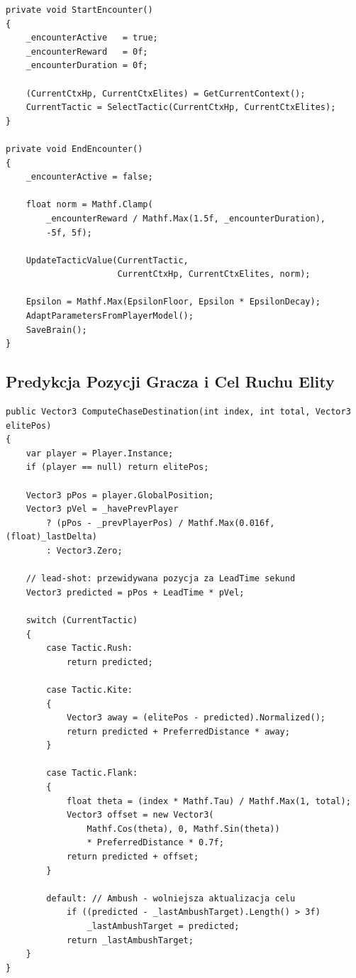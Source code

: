 \begin{lstlisting}[caption={EliteBrain.StartEncounter / EndEncounter},label={lst:eb-encounter}]
private void StartEncounter()
{
    _encounterActive   = true;
    _encounterReward   = 0f;
    _encounterDuration = 0f;

    (CurrentCtxHp, CurrentCtxElites) = GetCurrentContext();
    CurrentTactic = SelectTactic(CurrentCtxHp, CurrentCtxElites);
}

private void EndEncounter()
{
    _encounterActive = false;

    float norm = Mathf.Clamp(
        _encounterReward / Mathf.Max(1.5f, _encounterDuration),
        -5f, 5f);

    UpdateTacticValue(CurrentTactic,
                      CurrentCtxHp, CurrentCtxElites, norm);

    Epsilon = Mathf.Max(EpsilonFloor, Epsilon * EpsilonDecay);
    AdaptParametersFromPlayerModel();
    SaveBrain();
}
\end{lstlisting}

\subsection{Predykcja Pozycji Gracza i Cel Ruchu Elity}

\begin{lstlisting}[caption={EliteBrain.ComputeChaseDestination (fragment)},label={lst:eb-chase}]
public Vector3 ComputeChaseDestination(int index, int total, Vector3 elitePos)
{
    var player = Player.Instance;
    if (player == null) return elitePos;

    Vector3 pPos = player.GlobalPosition;
    Vector3 pVel = _havePrevPlayer
        ? (pPos - _prevPlayerPos) / Mathf.Max(0.016f, (float)_lastDelta)
        : Vector3.Zero;

    // lead-shot: przewidywana pozycja za LeadTime sekund
    Vector3 predicted = pPos + LeadTime * pVel;

    switch (CurrentTactic)
    {
        case Tactic.Rush:
            return predicted;

        case Tactic.Kite:
        {
            Vector3 away = (elitePos - predicted).Normalized();
            return predicted + PreferredDistance * away;
        }

        case Tactic.Flank:
        {
            float theta = (index * Mathf.Tau) / Mathf.Max(1, total);
            Vector3 offset = new Vector3(
                Mathf.Cos(theta), 0, Mathf.Sin(theta))
                * PreferredDistance * 0.7f;
            return predicted + offset;
        }

        default: // Ambush - wolniejsza aktualizacja celu
            if ((predicted - _lastAmbushTarget).Length() > 3f)
                _lastAmbushTarget = predicted;
            return _lastAmbushTarget;
    }
}
\end{lstlisting}

